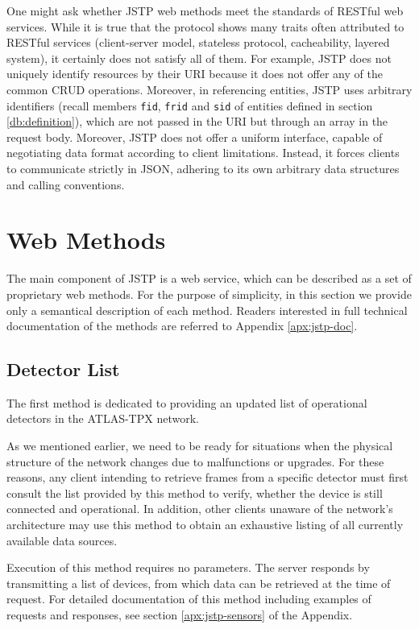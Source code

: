 One might ask whether JSTP web methods meet the standards of RESTful web services. While it is true that the protocol shows many traits often attributed to RESTful services (client-server model, stateless protocol, cacheability, layered system), it certainly does not satisfy all of them. For example, JSTP does not uniquely identify resources by their URI because it does not offer any of the common CRUD operations. Moreover, in referencing entities, JSTP uses arbitrary identifiers (recall members \texttt{fid}, \texttt{frid} and \texttt{sid} of entities defined in section \ref{db:definition}), which are not passed in the URI but through an array in the request body. Moreover, JSTP does not offer a uniform interface, capable of negotiating data format according to client limitations. Instead, it forces clients to communicate strictly in JSON, adhering to its own arbitrary data structures and calling conventions.

\todo %

\section{Web Methods}
\label{jstp:web-methods}
The main component of JSTP is a web service, which can be described as a set of proprietary web methods. For the purpose of simplicity, in this section we provide only a semantical description of each method. Readers interested in full technical documentation of the methods are referred to Appendix \ref{apx:jstp-doc}.

\subsection{Detector List}
The first method is dedicated to providing an updated list of operational detectors in the ATLAS-TPX network.

As we mentioned earlier, we need to be ready for situations when the physical structure of the network changes due to malfunctions or upgrades. For these reasons, any client intending to retrieve frames from a specific detector must first consult the list provided by this method to verify, whether the device is still connected and operational. In addition, other clients unaware of the network's architecture may use this method to obtain an exhaustive listing of all currently available data sources.

Execution of this method requires no parameters. The server responds by transmitting a list of devices, from which data can be retrieved at the time of request. For detailed documentation of this method including examples of requests and responses, see section \ref{apx:jstp-sensors} of the Appendix.

